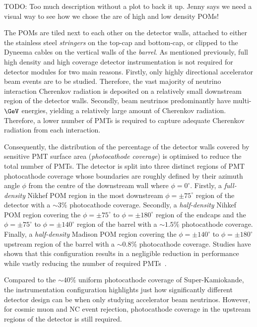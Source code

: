 TODO: Too much description without a plot to back it up. Jenny says we need a visual way to see
how we chose the are of high and low density POMs!

The POMs are tiled next to each other on the detector walls, attached to either the stainless
steel \emph{stringers} on the top-cap and bottom-cap, or clipped to the Dyneema cables on the
vertical walls of the \emph{barrel}. As mentioned previously, full high density and high coverage
detector instrumentation is not required for \chips detector modules for two main reasons.
Firstly, only highly directional accelerator beam events are to be studied. Therefore, the vast
majority of neutrino interaction Cherenkov radiation is deposited on a relatively small downstream
region of the detector walls. Secondly, beam neutrinos predominantly have multi-$\GeV$ energies,
yielding a relatively large amount of Cherenkov radiation. Therefore, a lower number of PMTs is
required to capture adequate Cherenkov radiation from each interaction.

Consequently, the distribution of the percentage of the detector walls covered by sensitive PMT
surface area (\emph{photocathode coverage}) is optimised to reduce the total number of PMTs. The
detector is split into three distinct regions of PMT photocathode coverage whose boundaries are
roughly defined by their azimuth angle $\phi$ from the centre of the downstream wall where
$\phi=0^{\circ}$. Firstly, a \emph{full-density} Nikhef POM region in the most downstream
$\phi=\pm75^{\circ}$ region of the detector with a $\sim3\%$ photocathode coverage. Secondly, a
\emph{half-density} Nihkef POM region covering the $\phi=\pm75^{\circ}$ to $\phi=\pm180^{\circ}$
region of the endcaps and the $\phi=\pm75^{\circ}$ to $\phi=\pm140^{\circ}$ region of the barrel
with a $\sim1.5\%$ photocathode coverage. Finally, a \emph{half-density} Madison POM region
covering the $\phi=\pm140^{\circ}$ to $\phi=\pm180^{\circ}$ upstream region of the barrel with a
$\sim0.8\%$ photocathode coverage. Studies have shown that this configuration results in a
negligible reduction in performance while vastly reducing the number of required
PMTs~\cite{blake2016}.

Compared to the $\sim40\%$ uniform photocathode coverage of Super-Kamiokande, the \chipsfive
instrumentation configuration highlights just how significantly different detector design can be
when only studying accelerator beam neutrinos. However, for cosmic muon and NC event rejection,
photocathode coverage in the upstream regions of the detector is still required.

